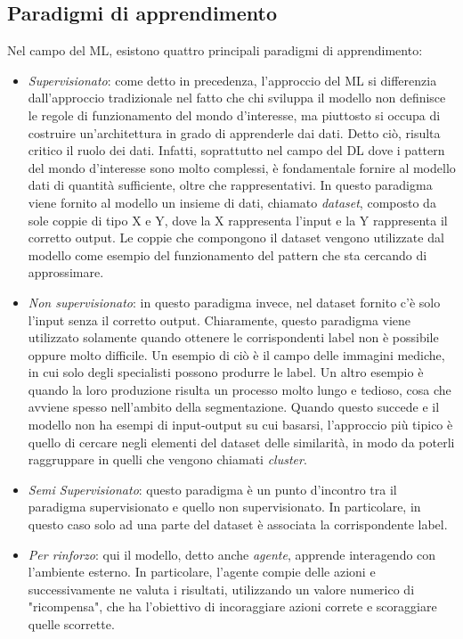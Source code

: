 \subsection{Paradigmi di apprendimento}
Nel campo del ML, esistono quattro principali paradigmi di apprendimento:

\begin{itemize}
    \item \textit{Supervisionato}: come detto in precedenza, l'approccio del ML si differenzia dall'approccio tradizionale nel fatto che chi sviluppa il modello non definisce le regole di funzionamento del mondo d'interesse, ma piuttosto si occupa di costruire un'architettura in grado di apprenderle dai dati. Detto ciò, risulta critico il ruolo dei dati. Infatti, soprattutto nel campo del DL dove i pattern del mondo d'interesse sono molto complessi, è fondamentale fornire al modello dati di quantità sufficiente, oltre che rappresentativi. In questo paradigma viene fornito al modello un insieme di dati, chiamato \textit{dataset}, composto da sole coppie di tipo X e Y, dove la X rappresenta l'input e la Y rappresenta il corretto output. Le coppie che compongono il dataset vengono utilizzate dal modello come esempio del funzionamento del pattern che sta cercando di approssimare.
    
    \item \textit{Non supervisionato}: in questo paradigma invece, nel dataset fornito c'è solo l'input senza il corretto output. Chiaramente, questo paradigma viene utilizzato solamente quando ottenere le corrispondenti label non è possibile oppure molto difficile. Un esempio di ciò è il campo delle immagini mediche, in cui solo degli specialisti possono produrre le label. Un altro esempio è quando la loro produzione risulta un processo molto lungo e tedioso, cosa che avviene spesso nell'ambito della segmentazione. Quando questo succede e il modello non ha esempi di input-output su cui basarsi, l'approccio più tipico è quello di cercare negli elementi del dataset delle similarità, in modo da poterli raggruppare in quelli che vengono chiamati \textit{cluster}.
    
    \item \textit{Semi Supervisionato}: questo paradigma è un punto d'incontro tra il paradigma supervisionato e quello non supervisionato. In particolare, in questo caso solo ad una parte del dataset è associata la corrispondente label.
    
    \item \textit{Per rinforzo}: qui il modello, detto anche \textit{agente}, apprende interagendo con l'ambiente esterno. In particolare, l'agente compie delle azioni e successivamente ne valuta i risultati, utilizzando un valore numerico di "ricompensa", che ha l'obiettivo di incoraggiare azioni correte e scoraggiare quelle scorrette.

\end{itemize}

